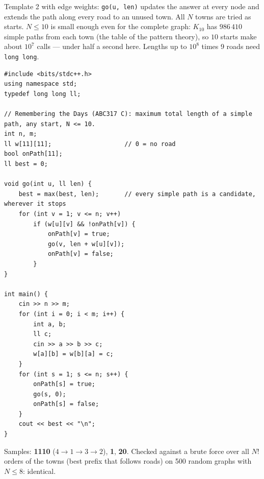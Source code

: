 \begin{solutionbox}
Template 2 with edge weights: \texttt{go(u, len)} updates the answer at every node and extends the path along every road to an unused town. All $N$ towns are tried as starts. $N \le 10$ is small enough even for the complete graph: $K_{10}$ has $986\,410$ simple paths from each town (the table of the pattern theory), so $10$ starts make about $10^7$ calls --- under half a second here. Lengths up to $10^8$ times 9 roads need \texttt{long long}.
\begin{lstlisting}[style=cpp]
#include <bits/stdc++.h>
using namespace std;
typedef long long ll;

// Remembering the Days (ABC317 C): maximum total length of a simple path, any start, N <= 10.
int n, m;
ll w[11][11];                    // 0 = no road
bool onPath[11];
ll best = 0;

void go(int u, ll len) {
    best = max(best, len);       // every simple path is a candidate, wherever it stops
    for (int v = 1; v <= n; v++)
        if (w[u][v] && !onPath[v]) {
            onPath[v] = true;
            go(v, len + w[u][v]);
            onPath[v] = false;
        }
}

int main() {
    cin >> n >> m;
    for (int i = 0; i < m; i++) {
        int a, b;
        ll c;
        cin >> a >> b >> c;
        w[a][b] = w[b][a] = c;
    }
    for (int s = 1; s <= n; s++) {
        onPath[s] = true;
        go(s, 0);
        onPath[s] = false;
    }
    cout << best << "\n";
}
\end{lstlisting}
Samples: \textbf{1110} ($4 \to 1 \to 3 \to 2$), \textbf{1}, \textbf{20}. Checked against a brute force over all $N!$ orders of the towns (best prefix that follows roads) on 500 random graphs with $N \le 8$: identical.
\end{solutionbox}


